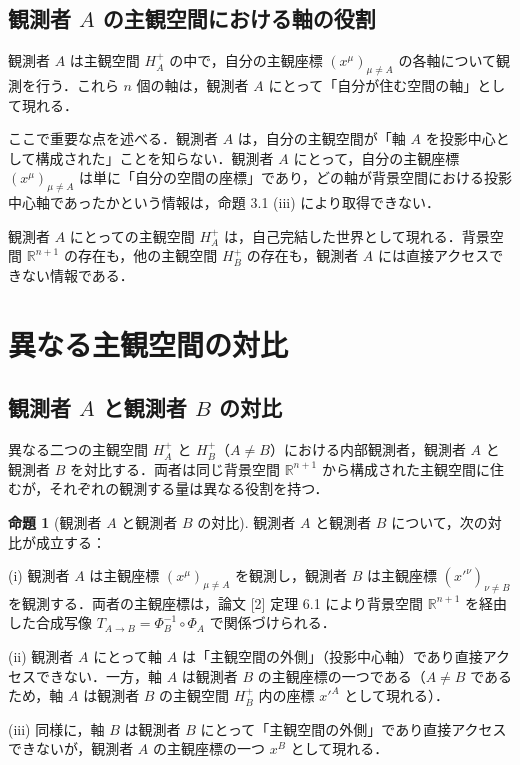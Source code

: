 \documentclass[a4paper,11pt]{ltjsarticle}
\theoremstyle{definition}
\newtheorem{proposition}[theorem]{命題}
\begin{document}
\subsection{観測者 \(A\) の主観空間における軸の役割}

観測者 \(A\) は主観空間 \(H_A^+\) の中で，自分の主観座標 \((x^\mu)_{\mu \neq A}\) の各軸について観測を行う．これら \(n\) 個の軸は，観測者 \(A\) にとって「自分が住む空間の軸」として現れる．

ここで重要な点を述べる．観測者 \(A\) は，自分の主観空間が「軸 \(A\) を投影中心として構成された」ことを知らない．観測者 \(A\) にとって，自分の主観座標 \((x^\mu)_{\mu \neq A}\) は単に「自分の空間の座標」であり，どの軸が背景空間における投影中心軸であったかという情報は，命題 3.1 (iii) により取得できない．

観測者 \(A\) にとっての主観空間 \(H_A^+\) は，自己完結した世界として現れる．背景空間 \(\mathbb{R}^{n+1}\) の存在も，他の主観空間 \(H_B^+\) の存在も，観測者 \(A\) には直接アクセスできない情報である．

\section{異なる主観空間の対比}

\subsection{観測者 \(A\) と観測者 \(B\) の対比}

異なる二つの主観空間 \(H_A^+\) と \(H_B^+\)（\(A \neq B\)）における内部観測者，観測者 \(A\) と観測者 \(B\) を対比する．両者は同じ背景空間 \(\mathbb{R}^{n+1}\) から構成された主観空間に住むが，それぞれの観測する量は異なる役割を持つ．

\begin{proposition}[観測者 \(A\) と観測者 \(B\) の対比]
観測者 \(A\) と観測者 \(B\) について，次の対比が成立する：

\textup{(i)} 観測者 \(A\) は主観座標 \((x^\mu)_{\mu \neq A}\) を観測し，観測者 \(B\) は主観座標 \((x'^\nu)_{\nu \neq B}\) を観測する．両者の主観座標は，論文 {[2]} 定理 6.1 により背景空間 \(\mathbb{R}^{n+1}\) を経由した合成写像 \(T_{A \to B} = \Phi_B^{-1} \circ \Phi_A\) で関係づけられる．

\textup{(ii)} 観測者 \(A\) にとって軸 \(A\) は「主観空間の外側」（投影中心軸）であり直接アクセスできない．一方，軸 \(A\) は観測者 \(B\) の主観座標の一つである（\(A \neq B\) であるため，軸 \(A\) は観測者 \(B\) の主観空間 \(H_B^+\) 内の座標 \(x'^A\) として現れる）．

\textup{(iii)} 同様に，軸 \(B\) は観測者 \(B\) にとって「主観空間の外側」であり直接アクセスできないが，観測者 \(A\) の主観座標の一つ \(x^B\) として現れる．
\end{proposition}
\end{document}
